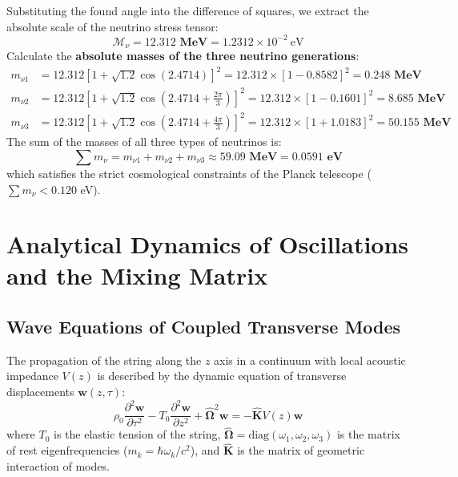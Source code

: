 \documentclass[12pt,a4paper]{article}
\begin{document}
		Substituting the found angle into the difference of squares, we extract the absolute scale of the neutrino stress tensor:
		\begin{equation}
			\mathcal{M}_\nu = \mathbf{12.312 \text{ MeV}} = 1.2312 \times 10^{-2} \ \text{eV}
		\end{equation}
		Calculate the \textbf{absolute masses of the three neutrino generations}:
		\begin{align}
			m_{\nu 1} &= 12.312 \left[ 1 + \sqrt{1.2} \cos(2.4714) \right]^2 = 12.312 \times [1 - 0.8582]^2 = \mathbf{0.248 \text{ MeV}} \\
			m_{\nu 2} &= 12.312 \left[ 1 + \sqrt{1.2} \cos\left(2.4714 + \frac{2\pi}{3}\right) \right]^2 = 12.312 \times [1 - 0.1601]^2 = \mathbf{8.685 \text{ MeV}} \\
			m_{\nu 3} &= 12.312 \left[ 1 + \sqrt{1.2} \cos\left(2.4714 + \frac{4\pi}{3}\right) \right]^2 = 12.312 \times [1 + 1.0183]^2 = \mathbf{50.155 \text{ MeV}}
		\end{align}
		The sum of the masses of all three types of neutrinos is:
		\begin{equation}
			\sum m_\nu = m_{\nu 1} + m_{\nu 2} + m_{\nu 3} \approx \mathbf{59.09 \text{ MeV}} = \mathbf{0.0591 \text{ eV}}
		\end{equation}
		which satisfies the strict cosmological constraints of the Planck telescope ($\sum m_\nu < 0.120$ eV).
		
		\section{Analytical Dynamics of Oscillations\\ and the Mixing Matrix}
		
		\subsection{Wave Equations of Coupled Transverse Modes}
		The propagation of the string along the $z$ axis in a continuum with local acoustic impedance $V(z)$ is described by the dynamic equation of transverse displacements $\mathbf{w}(z, \tau)$:
		\begin{equation}
			\rho_0 \frac{\partial^2 \mathbf{w}}{\partial \tau^2} - T_0 \frac{\partial^2 \mathbf{w}}{\partial z^2} + \hat{\mathbf{\Omega}}^2 \mathbf{w} = - \hat{\mathbf{K}} V(z) \mathbf{w}
		\end{equation}
		where $T_0$ is the elastic tension of the string, $\hat{\mathbf{\Omega}} = \text{diag}(\omega_1, \omega_2, \omega_3)$ is the matrix of rest eigenfrequencies ($m_k = \hbar \omega_k / c^2$), and $\hat{\mathbf{K}}$ is the matrix of geometric interaction of modes.
		
\end{document}
